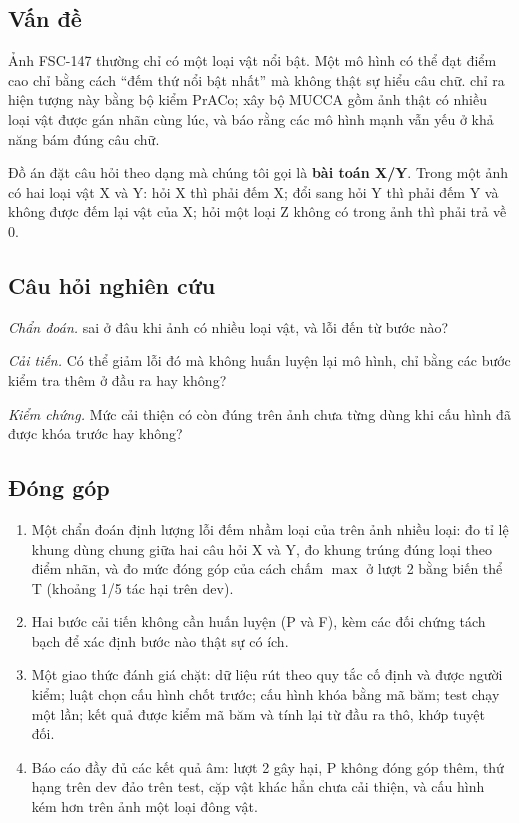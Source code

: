 \documentclass[12pt,a4paper]{article}
\begin{document}
\subsection{Vấn đề}
Ảnh FSC-147 thường chỉ có một loại vật nổi bật. Một mô hình có thể đạt điểm cao chỉ bằng cách ``đếm thứ nổi bật nhất'' mà không thật sự hiểu câu chữ. \textcite{ciampi2025praco} chỉ ra hiện tượng này bằng bộ kiểm PrACo; \textcite{pacini2026mucca} xây bộ MUCCA gồm ảnh thật có nhiều loại vật được gán nhãn cùng lúc, và báo rằng các mô hình mạnh vẫn yếu ở khả năng bám đúng câu chữ.

Đồ án đặt câu hỏi theo dạng mà chúng tôi gọi là \textbf{bài toán X/Y}. Trong một ảnh có hai loại vật X và Y: hỏi X thì phải đếm X; đổi sang hỏi Y thì phải đếm Y và không được đếm lại vật của X; hỏi một loại Z không có trong ảnh thì phải trả về 0.

\subsection{Câu hỏi nghiên cứu}
\begin{description}[leftmargin=1.2cm,style=nextline]
\item[RQ1] \emph{Chẩn đoán.} \cgdpp{} sai ở đâu khi ảnh có nhiều loại vật, và lỗi đến từ bước nào?
\item[RQ2] \emph{Cải tiến.} Có thể giảm lỗi đó mà không huấn luyện lại mô hình, chỉ bằng các bước kiểm tra thêm ở đầu ra hay không?
\item[RQ3] \emph{Kiểm chứng.} Mức cải thiện có còn đúng trên ảnh chưa từng dùng khi cấu hình đã được khóa trước hay không?
\end{description}

\subsection{Đóng góp}
\begin{enumerate}
\item Một chẩn đoán định lượng lỗi đếm nhầm loại của \cgdpp{} trên ảnh nhiều loại: đo tỉ lệ khung dùng chung giữa hai câu hỏi X và Y, đo khung trúng đúng loại theo điểm nhãn, và đo mức đóng góp của cách chấm $\max$ ở lượt 2 bằng biến thể T (khoảng 1/5 tác hại trên dev).
\item Hai bước cải tiến không cần huấn luyện (P và F), kèm các đối chứng tách bạch để xác định bước nào thật sự có ích.
\item Một giao thức đánh giá chặt: dữ liệu rút theo quy tắc cố định và được người kiểm; luật chọn cấu hình chốt trước; cấu hình khóa bằng mã băm; test chạy một lần; kết quả được kiểm mã băm và tính lại từ đầu ra thô, khớp tuyệt đối.
\item Báo cáo đầy đủ các kết quả âm: lượt 2 gây hại, P không đóng góp thêm, thứ hạng trên dev đảo trên test, cặp vật khác hẳn chưa cải thiện, và cấu hình kém hơn trên ảnh một loại đông vật.
\end{enumerate}
\end{document}
